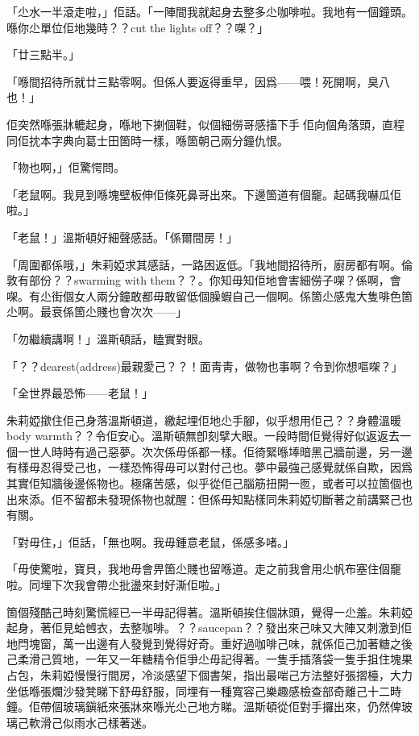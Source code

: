 「尐水一半滾走啦，」佢話。「一陣間我就起身去整多尐咖啡啦。我地有一個鐘頭。喺你尐單位佢地幾時？？cut the lights off？？㗎？」

「廿三點半。」

「喺間招待所就廿三點零啊。但係人要返得重早，因爲——喂！死開啊，臭八也！」

佢突然喺張牀轆起身，喺地下揦個鞋，似個細僗哥感搐下手𠌸佢向個角落頭，直程同佢抌本字典向葛士田箇時一樣，喺箇朝己兩分鐘仇恨。

「物也啊，」佢驚愕問。

「老鼠啊。我見到喺塊壁板伸佢條死鼻哥出來。下邊箇道有個竉。起碼我嚇瓜佢啦。」

「老鼠！」溫斯頓好細聲感話。「係爾間房！」

「周圍都係哦，」朱莉婭求其感話，一路困返低。「我地間招待所，廚房都有啊。倫敦有部份？？swarming with them？？。你知毋知佢地會害細僗子㗎？係啊，會㗎。有尐街個女人兩分鐘敢都毋敢留低個臊蝦自己一個啊。係箇尐感鬼大隻啡色箇尐啊。最衰係箇尐賤也會次次——」

「勿繼續講啊！」溫斯頓話，瞌實對眼。

「？？dearest(address)最親愛己？？！面靑靑，做物也事啊？令到你想嘔㗎？」

「全世界最恐怖——老鼠！」

朱莉婭撳住佢己身落溫斯頓道，繳起埋佢地尐手腳，似乎想用佢己？？身體溫暖body warmth？？令佢安心。溫斯頓無卽刻擘大眼。一段時間佢覺得好似返返去一個一世人時時有過己惡夢。次次係毋係都一樣。佢徛緊喺埲暗黑己牆前邊，另一邊有樣毋忍得受己也，一樣恐怖得毋可以對付己也。夢中最強己感覺就係自欺，因爲其實佢知牆後邊係物也。極痛苦感，似乎從佢己腦筋扭開一匢，或者可以拉箇個也出來添。佢不留都未發現係物也就醒：但係毋知點樣同朱莉婭切斷著之前講緊己也有關。

「對毋住，」佢話，「無也啊。我毋鍾意老鼠，係感多啫。」

「毋使驚啦，寶貝，我地毋會畀箇尐賤也留喺道。走之前我會用尐帆布塞住個竉啦。同埋下次我會帶尐批盪來封好澌佢啦。」

箇個殘酷己時刻驚慌經已一半毋記得著。溫斯頓挨住個牀頭，覺得一尐羞。朱莉婭起身，著佢見蛤乸衣，去整咖啡。？？saucepan？？發出來己味又大陣又刺激到佢地閂塊窗，萬一出邊有人發覺到覺得好奇。重好過咖啡己味，就係佢己加著糖之後己柔滑己質地，一年又一年糖精令佢爭尐毋記得著。一隻手插落袋一隻手抯住塊果占包，朱莉婭慢慢行間房，冷淡感望下個書架，指出最啱己方法整好張摺檯，大力坐低喺張爛沙發凳睇下舒毋舒服，同埋有一種寬容己樂趣感檢查部奇離己十二時鐘。佢帶個玻璃鎭紙來張牀來喺光尐己地方睇。溫斯頓從佢對手攞出來，仍然俾玻璃己軟滑己似雨水己樣著迷。

